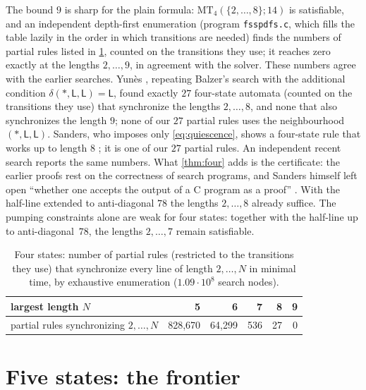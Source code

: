 The bound $9$ is sharp for the plain formula: $\mathrm{MT}_4(\{2,\dots,8\};14)$
is satisfiable, and an independent depth-first enumeration (program
\texttt{fsspdfs.c}, which fills the table lazily in the order in which
transitions are needed) finds the numbers of partial rules listed in
\cref{tab:four}, counted on the transitions they use; it reaches zero exactly
at the lengths $2,\dots,9$, in agreement with the solver. These numbers
agree with the earlier searches. Yun\`es \cite[\S3.1]{Yunes93}, repeating
Balzer's search with the additional condition $\delta(\ast,\mathsf
L,\mathsf L)=\mathsf L$, found exactly $27$ four-state automata (counted on
the transitions they use) that synchronize the lengths $2,\dots,8$, and none
that also synchronizes the length $9$; none of our $27$ partial rules uses
the neighbourhood $(\ast,\mathsf L,\mathsf L)$. Sanders, who imposes only
\eqref{eq:quiescence}, shows a four-state rule that works up to length $8$
\cite[Fig.~2]{Sanders94}; it is one of our $27$ partial rules. An
independent recent search \cite{AverageUser21} reports the same numbers.
What \cref{thm:four} adds is the certificate: the earlier proofs rest on
the correctness of search programs, and Sanders himself left open
``whether one accepts the output of a C program as a proof''
\cite{Sanders94}. With the half-line extended to
anti-diagonal $78$ the lengths $2,\dots,8$ already suffice. The pumping
constraints alone are weak for four states: together with the half-line up
to anti-diagonal~$78$, the lengths $2,\dots,7$ remain satisfiable.

\begin{table}[t]
\centering\small
\begin{tabular}{@{}lrrrrr@{}}
\toprule
largest length $N$ & 5 & 6 & 7 & 8 & 9\\
\midrule
partial rules synchronizing $2,\dots,N$ & 828{,}670 & 64{,}299 & 536 & 27 & 0\\
\bottomrule
\end{tabular}
\caption{Four states: number of partial rules (restricted to the transitions
they use) that synchronize every line of length $2,\dots,N$ in minimal time,
by exhaustive enumeration ($1.09\cdot10^{8}$ search nodes).}\label{tab:four}
\end{table}

\section{Five states: the frontier}\label{sec:five}

